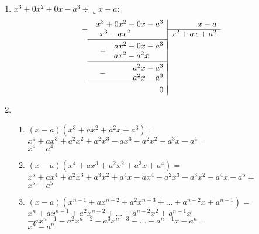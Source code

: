 \documentclass[10pt]{book}
\newcommand{\dropsign}[1]{\smash{\llap{\raisebox{-.5\normalbaselineskip}{$#1$\hspace{2\arraycolsep}}}}}%
\begin{document}
\begin{enumerate}
\begin{enumerate}
		\end{enumerate}
		\item %
			$x^3 + 0x^2 + 0x - a^3 \div \llcorner x - a$:
			\\
			\[
  \begin{array}{r|r}
    \dropsign{-} x^3 + 0x^2 + 0x - a^3 & x - a \\ \cline{2-2}
    x^3 - ax^2 \phantom{ + 0x - a^3}& x^2 + ax + a^2 \\ \cline{1-1} \\[\dimexpr-\normalbaselineskip+\jot]
    \dropsign{-}ax^2 + 0x - a^3 \\
           \phantom{0x^3 + } ax^2 - a^2x \phantom{+ a^3} \\ \cline{1-1} \\[\dimexpr-\normalbaselineskip+\jot]
    \dropsign{-}\phantom{ax^2 + }a^2x - a^3 \\
           \phantom{0x^3 + ax^2 + } a^2x - a^3 \\ \cline{1-1} \\[\dimexpr-\normalbaselineskip+\jot]
                      0
  \end{array}
\]
		\item %
		\begin{enumerate}
			\addtocounter{enumii}{2}
			\item %
				$(x - a)(x^3 + ax^2 +a^2x + a^3) = $\\
				$x^4 + ax^3 + a^2x^2 + a^2x^3 - ax^3 - a^2x^2 - a^3x - a^4 = $\\
				$x^4 - a^4$
				
			\item %
				$(x - a)(x^4 + ax^3 +a^2x^2 + a^3x + a^4) = $\\
				$x^5 + ax^4 + a^2x^3 + a^3x^2 + a^4x - ax^4 - a^2x^3 - a^3x^2 - a^4x - a^5 = $\\
				$x^5 - a^5$
				
			\item %
			$(x - a)(x^{n-1} + ax^{n-2} +a^2x^{n-3} + ... + a^{n-2}x + a^{n-1}) = $\\
			$x^{n} + ax^{n-1} +a^2x^{n-2} + ... + a^{n-2}x^2 + a^{n-1}x$ \\ 
			$- ax^{n-1} - a^2x^{n-2} -a^3x^{n-3} - ... - a^{n-1}x - a^{n} =$\\
			$x^{n} - a^{n}$\\
			

\end{enumerate}
\end{enumerate}
\end{document}
